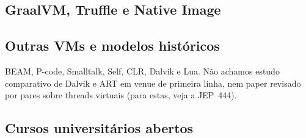 \subsection{GraalVM, Truffle e Native Image}

\subsection{Outras VMs e modelos históricos}
BEAM, P-code, Smalltalk, Self, CLR, Dalvik e Lua. Não achamos estudo
comparativo de Dalvik e ART em venue de primeira linha, nem paper revisado
por pares sobre threads virtuais (para estas, veja a JEP~444).

\subsection{Cursos universitários abertos}
